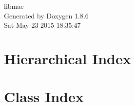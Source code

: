 \documentclass[twoside]{book}
\newcommand{\clearemptydoublepage}{%
  \newpage{\pagestyle{empty}\cleardoublepage}%
}
\begin{document}
\hypersetup{pageanchor=false}
\begin{titlepage}
\vspace*{7cm}
\begin{center}%
{\Large libmae }\\
\vspace*{1cm}
{\large Generated by Doxygen 1.8.6}\\
\vspace*{0.5cm}
{\small Sat May 23 2015 18:35:47}\\
\end{center}
\end{titlepage}
\clearemptydoublepage
\tableofcontents
\clearemptydoublepage
{}
\hypersetup{pageanchor=true}

\chapter{Hierarchical Index}

\chapter{Class Index}

\end{document}
